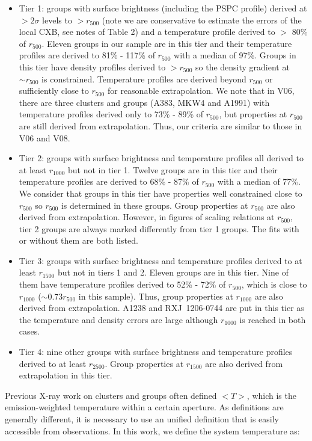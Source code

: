 \documentclass{aastex}
\begin{document}
\begin{itemize}
\item Tier 1: groups with surface brightness (including the PSPC profile) derived at
$> 2\sigma$ levels to $> r_{500}$ (note we are conservative to estimate the errors of
the local CXB, see notes of Table 2) and a temperature profile derived to
$>$ 80\% of $r_{500}$. Eleven groups in our sample are in this tier and their
temperature profiles are derived to 81\% - 117\% of $r_{500}$ with a median of 97\%.
Groups in this tier have density profiles derived to $> r_{500}$ so the density
gradient at $\sim r_{500}$ is constrained. Temperature profiles are derived
beyond $r_{500}$ or sufficiently close to $r_{500}$ for reasonable extrapolation.
We note that in V06, there are three clusters and groups (A383, MKW4 and A1991)
with temperature profiles derived only to 73\% - 89\% of $r_{500}$, but properties
at $r_{500}$ are still derived from extrapolation. Thus, our criteria are similar
to those in V06 and V08.
\item Tier 2: groups with surface brightness and temperature profiles all derived
to at least $r_{1000}$ but not in tier 1. Twelve groups are in this tier and their temperature
profiles are derived to 68\% - 87\% of $r_{500}$ with a median of 77\%.
We consider that groups in this tier have properties well constrained close to
$r_{500}$ so $r_{500}$ is determined in these groups. Group properties at $r_{500}$
are also derived from extrapolation. However, in figures of scaling relations at
$r_{500}$, tier 2 groups are always marked differently from tier 1 groups. The fits
with or without them are both listed.
\item Tier 3: groups with surface brightness and temperature profiles derived
to at least $r_{1500}$ but not in tiers 1 and 2. Eleven groups are in this tier.
Nine of them have temperature profiles derived to 52\% - 72\% of $r_{500}$, which is
close to $r_{1000}$ ($\sim 0.73 r_{500}$ in this sample). Thus, group properties
at $r_{1000}$ are also derived from extrapolation. A1238 and RXJ~1206-0744 are
put in this tier as the temperature and density errors are large although $r_{1000}$
is reached in both cases.
\item Tier 4: nine other groups with surface brightness and temperature profiles
derived to at least $r_{2500}$. Group properties at $r_{1500}$ are also derived from
extrapolation in this tier.
\end{itemize}

Previous X-ray work on clusters and groups often defined $<T>$, which is the
emission-weighted temperature within a certain aperture. As definitions
are generally different, it is necessary to use an unified definition that
is easily accessible from observations. In this work, we define the system temperature as:
\end{document}
